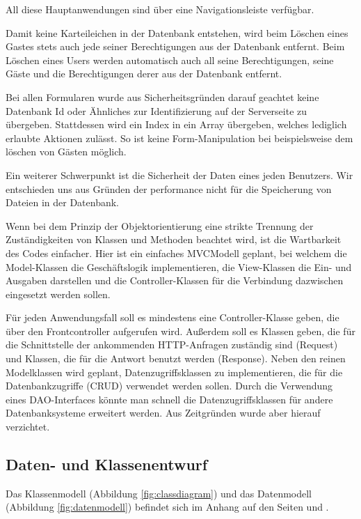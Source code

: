 \documentclass[10pt]{scrarticle}
\begin{document}
All diese Hauptanwendungen sind über eine Navigationsleiste verfügbar.

Damit keine Karteileichen in der Datenbank entstehen, wird beim Löschen eines Gastes stets auch jede seiner Berechtigungen aus der Datenbank entfernt. Beim Löschen eines Users werden automatisch auch all seine Berechtigungen, seine Gäste und die Berechtigungen derer aus der Datenbank entfernt.

Bei allen Formularen wurde aus Sicherheitsgründen darauf geachtet keine Datenbank Id oder Ähnliches zur Identifizierung auf der Serverseite zu übergeben. Stattdessen wird ein Index in ein Array übergeben, welches lediglich erlaubte Aktionen zulässt. So ist keine Form-Manipulation bei beispielsweise dem löschen von Gästen möglich.

Ein weiterer Schwerpunkt ist die Sicherheit der Daten eines jeden Benutzers. Wir entschieden uns aus Gründen der performance nicht für die Speicherung von Dateien in der Datenbank.

Wenn bei dem Prinzip der Objektorientierung eine strikte Trennung der Zuständigkeiten von Klassen und Methoden beachtet wird, ist die Wartbarkeit des Codes einfacher. Hier ist ein einfaches MVCModell geplant, bei welchem die Model-Klassen die Geschäftslogik implementieren, die View-Klassen die Ein- und Ausgaben darstellen und die Controller-Klassen für die Verbindung dazwischen eingesetzt werden sollen. 

 Für jeden Anwendungsfall soll es mindestens eine Controller-Klasse geben, die über den Frontcontroller aufgerufen wird. Außerdem soll es Klassen geben, die für die Schnittstelle der ankommenden HTTP-Anfragen zuständig sind (Request) und Klassen, die für die Antwort benutzt werden (Response). Neben den reinen Modelklassen wird geplant, Datenzugriffsklassen zu implementieren, die für die Datenbankzugriffe (CRUD) verwendet werden sollen. Durch die Verwendung eines DAO-Interfaces könnte man schnell die Datenzugriffsklassen für andere Datenbanksysteme erweitert werden. Aus Zeitgründen wurde aber hierauf verzichtet. 

\subsection{Daten- und Klassenentwurf}

Das Klassenmodell (Abbildung \ref{fig:classdiagram}) und das Datenmodell (Abbildung \ref{fig:datenmodell}) befindet sich im Anhang auf den Seiten \pageref{fig:classdiagram} und \pageref{fig:datenmodell}.
\end{document}
